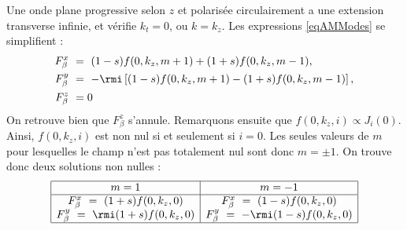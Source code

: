 Une onde plane progressive selon $z$ et polarisée circulairement a une extension transverse infinie, et vérifie $k_t = 0$, ou $k = k_z$. Les expressions \ref{eqAMModes} se simplifient :
\begin{equation}
\begin{aligned}
F_{\beta}^x ~&= ~(1-s)f(0,k_z,m+1)+(1+s)f(0,k_z,m-1),\\
F_{\beta}^y ~&= ~-\rmi\left[(1-s)f(0,k_z,m+1)-(1+s)f(0,k_z,m-1)\right],\\
F_{\beta}^z ~&= 0
\end{aligned}
\end{equation}
On retrouve bien que $F_{\beta}^z$ s'annule. Remarquons ensuite que $f(0,k_z,i) \propto J_i(0)$. Ainsi, $f(0,k_z,i)$ est non nul si et seulement si $i = 0$. Les seules valeurs de $m$ pour lesquelles le champ n'est pas totalement nul sont donc $m=\pm 1$. On trouve donc deux solutions non nulles :
\[
\begin{array}{|c|c|}
	\hline
	m = 1 &m = -1 \\
	\hline
	F_{\beta}^x ~= ~(1+s)f(0,k_z,0) & F_{\beta}^x ~= ~(1-s)f(0,k_z,0)\\
		F_{\beta}^y ~= ~\rmi(1+s)f(0,k_z,0) & F_{\beta}^y ~= ~-\rmi(1-s)f(0,k_z,0)\\
		\hline
\end{array}\]

